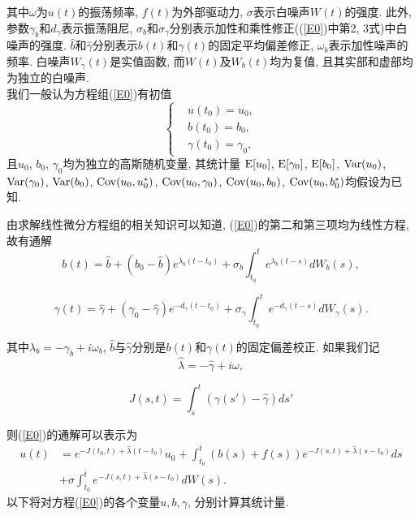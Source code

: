 \documentclass[notitlepage,cs4size,punct,oneside]{ctexrep}
\numberwithin{equation}{section}
\theoremstyle{mystyle}
\begin{document}
其中$\omega$为$u(t)$的振荡频率, $f(t)$为外部驱动力, $\sigma$表示白噪声$W(t)$的强度. 此外, 参数$\gamma_b$和$d_\gamma$表示振荡阻尼, $\sigma_b$和$\sigma_\gamma$分别表示加性和乘性修正((\ref{E0})中第2, 3式)中白噪声的强度. $\hat{b}$和$\hat{\gamma}$分别表示$b(t)$和$\gamma(t)$的固定平均偏差修正, $\omega_b$表示加性噪声的频率. 白噪声$W_\gamma(t)$是实值函数, 而$W(t)$及$W_b(t)$均为复值, 且其实部和虚部均为独立的白噪声. \\

我们一般认为方程组(\ref{E0})有初值
\begin{equation} \label{init_values}
\left\{
\begin{split}
& u(t_0) = u_0, \\
& b(t_0) = b_0, \\
& \gamma(t_0) = \gamma_0,
\end{split}
\right.
\end{equation}
且$u_0$, $b_0$, $\gamma_0$均为独立的高斯随机变量, 其统计量
$\text{E}[u_0]$, $\text{E}[\gamma_0]$, $\text{E}[b_0]$, $\text{Var}(u_0)$, $\text{Var}(\gamma_0)$, $\text{Var}(b_0)$, $\text{Cov}(u_0, u_0^*)$, $\text{Cov}(u_0, \gamma_0)$, $\text{Cov}(u_0, b_0)$, $\text{Cov}(u_0, b_0^*)$均假设为已知.

由求解线性微分方程组的相关知识\cite{fulinjin1984ordinary}可以知道, (\ref{E0})的第二和第三项均为线性方程, 故有通解
\begin{equation} \label{Sb}
b(t) = \hat{b}+(b_0-\hat{b})e^{\lambda_b(t-t_0)}+\sigma_b\int_{t_0}^t e^{\lambda_b(t-s)}dW_b(s),
\end{equation}

\begin{equation} \label{Sg}
\gamma(t) = \hat{\gamma}+(\gamma_0-\hat{\gamma})e^{-d_{\gamma}(t-t_0)}+\sigma_{\gamma}\int_{t_0}^t e^{-d_{\gamma}(t-s)}dW_{\gamma}(s).
\end{equation}

其中$\lambda_b = -\gamma_b+i\omega_b$, $\hat{b}$与$\hat{\gamma}$分别是$b(t)$和$\gamma(t)$的固定偏差校正.
如果我们记
\begin{equation}
\hat{\lambda} = -\hat{\gamma}+i\omega,
\end{equation}

\begin{equation} \label{def J(s, t)}
J(s, t) = \int_s^t (\gamma(s')-\hat{\gamma})ds'
\end{equation}

则(\ref{E0})的通解可以表示为
\begin{equation} \label{Su}
\begin{split}
u(t) &= e^{-J(t_0, t)+\hat{\lambda}(t-t_0)}u_0 + \int_{t_0}^t (b(s)+f(s))e^{-J(s, t)+\hat{\lambda}(s-t_0)}ds \\
& + \sigma\int_{t_0}^{t}e^{-J(s, t)+\hat{\lambda}(s-t_0)}dW(s).
\end{split}
\end{equation}
以下将对方程(\ref{E0})的各个变量$u, b, \gamma$, 分别计算其统计量.
\end{document}
